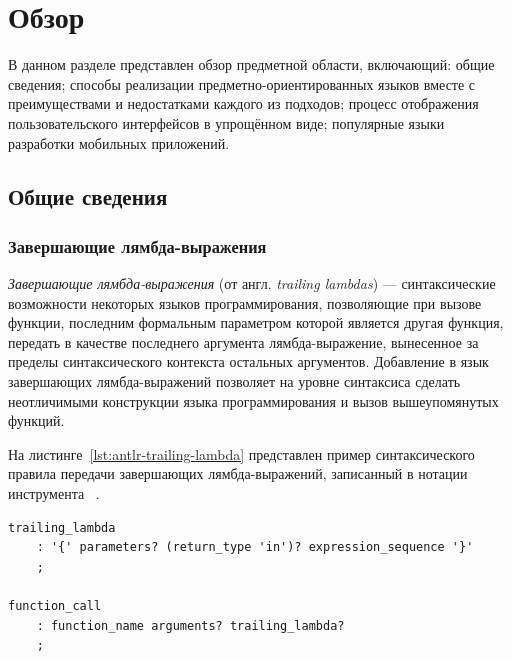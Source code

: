 \section{Обзор}
В данном разделе представлен обзор предметной области, включающий: общие 
сведения; способы реализации предметно-ориентированных языков вместе с
преимуществами и недостатками каждого из подходов; процесс отображения пользовательского интерфейсов в упрощённом виде; популярные языки
разработки мобильных приложений.

\subsection{Общие сведения}


\subsubsection{Завершающие лямбда-выражения}
\label{section:trailing-lambdas}
\textit{Завершающие лямбда-выражения} (от англ. \textit{trailing lambdas})
--- синтаксические возможности некоторых языков программирования,
позволяющие при вызове функции, последним формальным параметром которой
является другая функция, передать в качестве последнего
аргумента лямбда-выражение, вынесенное за пределы синтаксического контекста
остальных аргументов. Добавление в язык завершающих лямбда-выражений
позволяет на уровне синтаксиса сделать неотличимыми конструкции языка
программирования и вызов вышеупомянутых функций.

На листинге~\ref{lst:antlr-trailing-lambda} представлен пример
синтаксического правила передачи завершающих лямбда-выражений, записанный
в нотации инструмента ~\cite{antlr-homepage}.
\begin{lstlisting}[style=Antlr, caption=Синтаксическое правило завершающих
лямбда-выражений, label={lst:antlr-trailing-lambda}]
trailing_lambda
	: '{' parameters? (return_type 'in')? expression_sequence '}'
	;

function_call
	: function_name arguments? trailing_lambda?
	;
\end{lstlisting}
